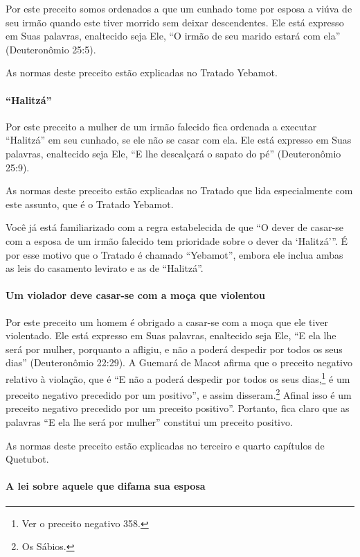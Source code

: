 Por este preceito somos ordenados a que um cunhado tome por esposa a
viúva de seu irmão quando este tiver morrido sem deixar descendentes.
Ele está expresso em Suas palavras, enaltecido seja Ele, ``O irmão de
seu marido estará com ela'' (Deuteronômio 25:5).

As normas deste preceito estão explicadas no Tratado Yebamot.

\paragraph{``Halitzá''}

Por este preceito a mulher de um irmão falecido fica ordenada a
executar ``Halitzá'' em seu cunhado, se ele não se casar com ela. Ele
está expresso em Suas palavras, enaltecido seja Ele, ``E lhe descalçará
o sapato do pé'' (Deuteronômio 25:9).

As normas deste preceito estão explicadas no Tratado que lida
especialmente com este assunto, que é o Tratado Yebamot.

Você já está familiarizado com a regra estabelecida de que ``O dever de
casar-se com a esposa de um irmão falecido tem prioridade sobre o dever
da `Halitzá'''. É por esse motivo que o Tratado é chamado ``Yebamot'',
embora ele inclua ambas as leis do casamento levirato e as de
``Halitzá''.

\paragraph{Um violador deve casar-se com a moça que violentou}

Por este preceito um homem é obrigado a casar-se com a moça que ele
tiver violentado. Ele está expresso em Suas palavras, enaltecido seja
Ele, ``E ela lhe será por mulher, porquanto a afligiu, e não a poderá
despedir por todos os seus dias'' (Deuteronômio 22:29). A Guemará de
Macot afirma que o preceito negativo relativo à violação, que é ``E não
a poderá despedir por todos os seus dias,\footnote{Ver o preceito negativo 358.} é um preceito negativo precedido por um positivo'', e assim
disseram.\footnote{Os Sábios.} Afinal isso é um preceito negativo
precedido por um preceito positivo''. Portanto, fica claro que as palavras ``E ela lhe será por mulher'' constitui um preceito positivo.

As normas deste preceito estão explicadas no terceiro e quarto
capítulos de Quetubot.

\paragraph{A lei sobre aquele que difama sua esposa}

